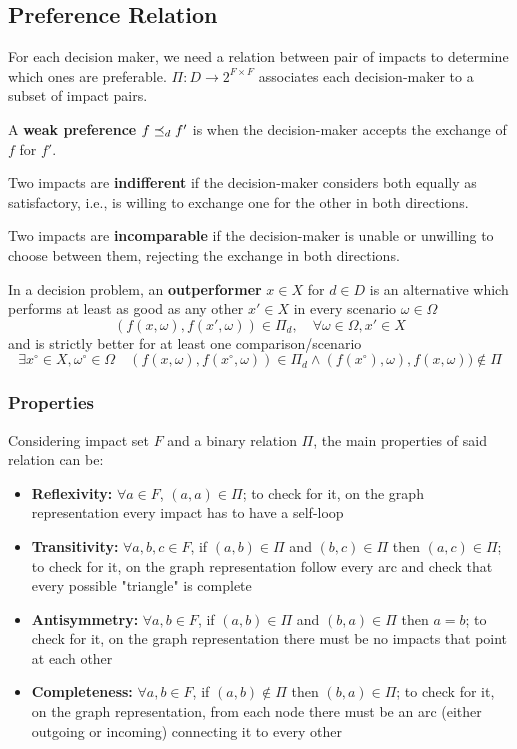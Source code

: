 \subsection{Preference Relation}

For each decision maker, we need a relation between pair of impacts to determine which ones are preferable. $\Pi: D \rightarrow 2^{F \times F}$ associates each decision-maker to a subset of impact pairs.

A \textbf{weak preference} $f \preceq_{d} f'$ is when the decision-maker accepts the exchange of $f$ for $f'$.

Two impacts are \textbf{indifferent} if the decision-maker considers both equally as satisfactory, i.e., is willing to exchange one for the other in both directions.

Two impacts are \textbf{incomparable} if the decision-maker is unable or unwilling to choose between them, rejecting the exchange in both directions.

In a decision problem, an \textbf{outperformer} $x \in X$ for $d \in D$ is an alternative which performs at least as good as any other $x' \in X$ in every scenario $\omega \in \Omega$
$$ (f(x, \omega), f(x', \omega)) \in \Pi_d, \quad \forall \omega \in \Omega, x' \in X $$
and is strictly better for at least one comparison/scenario
$$ \exists x^\circ \in X, \omega^\circ \in \Omega \quad (f(x, \omega), f(x^\circ, \omega)) \in \Pi_d \wedge (f(x^\circ), \omega), f(x, \omega)) \notin \Pi$$

\subsubsection{Properties}

Considering impact set $F$ and a binary relation $\Pi$, the main properties of said relation can be:
\begin{itemize}
	\item \textbf{Reflexivity:} $\forall a \in F$, $(a,a) \in \Pi$; to check for it, on the graph representation every impact has to have a self-loop
	
	\item \textbf{Transitivity:} $\forall a,b,c \in F$, if $(a,b) \in \Pi$ and $(b,c) \in \Pi$ then $(a,c) \in \Pi$; to check for it, on the graph representation follow every arc and check that every possible "triangle" is complete
	
	\item \textbf{Antisymmetry:} $\forall a,b \in F$, if $(a,b) \in \Pi$ and $(b,a) \in \Pi$ then $a = b$; to check for it, on the graph representation there must be no impacts that point at each other
	
	\item \textbf{Completeness:} $\forall a,b \in F$, if $(a,b) \notin \Pi$ then $(b, a) \in \Pi$; to check for it, on the graph representation, from each node there must be an arc (either outgoing or incoming) connecting it to every other
\end{itemize}

